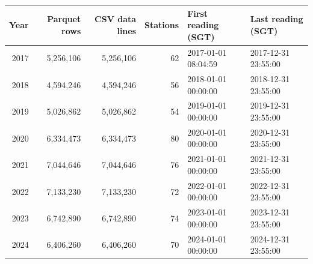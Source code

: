 \begin{tabular}{rrrrll}
\toprule
Year & Parquet rows & CSV data lines & Stations & First reading (SGT) & Last reading (SGT) \\
\midrule
2017 & 5{,}256{,}106 & 5{,}256{,}106 & 62 & 2017-01-01 08:04:59 & 2017-12-31 23:55:00 \\
2018 & 4{,}594{,}246 & 4{,}594{,}246 & 56 & 2018-01-01 00:00:00 & 2018-12-31 23:55:00 \\
2019 & 5{,}026{,}862 & 5{,}026{,}862 & 54 & 2019-01-01 00:00:00 & 2019-12-31 23:55:00 \\
2020 & 6{,}334{,}473 & 6{,}334{,}473 & 80 & 2020-01-01 00:00:00 & 2020-12-31 23:55:00 \\
2021 & 7{,}044{,}646 & 7{,}044{,}646 & 76 & 2021-01-01 00:00:00 & 2021-12-31 23:55:00 \\
2022 & 7{,}133{,}230 & 7{,}133{,}230 & 72 & 2022-01-01 00:00:00 & 2022-12-31 23:55:00 \\
2023 & 6{,}742{,}890 & 6{,}742{,}890 & 74 & 2023-01-01 00:00:00 & 2023-12-31 23:55:00 \\
2024 & 6{,}406{,}260 & 6{,}406{,}260 & 70 & 2024-01-01 00:00:00 & 2024-12-31 23:55:00 \\
\bottomrule
\end{tabular}
